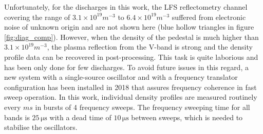 \documentclass[12pt]{iopart}
\begin{document}
Unfortunately, for the discharges in this work, the LFS reflectometry channel covering the range of $3.1\times10^{19}m^{-3}$ to $6.4\times10^{19}m^{-3}$ suffered from electronic noise of unknown origin and are not shown here (blue hollow triangles in figure \ref{fig:diag_comp}). However, when the density of the pedestal is much higher than $3.1\times10^{19}m^{-3}$, the plasma reflection from the V-band is strong and the density profile data can be recovered in post-processing. This task is quite laborious and has been only done for few discharges. To avoid future issues in this regard, a new system with a single-source oscillator and with a frequency translator configuration has been installed in 2018 that assures frequency coherence in fast sweep operation. In this work, individual density profiles are measured routinely every $ms$ in bursts of 4 frequency sweeps. The frequency sweeping time for all bands is $\mathrm{25\,\mu s}$ with a dead time of $\mathrm{10\,\mu s}$ between sweeps, which is needed to stabilise the oscillators.

\end{document}

